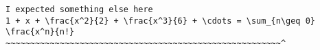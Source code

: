 \begin{verbatim}
I expected something else here
1 + x + \frac{x^2}{2} + \frac{x^3}{6} + \cdots = \sum_{n\geq 0} \frac{x^n}{n!}
~~~~~~~~~~~~~~~~~~~~~~~~~~~~~~~~~~~~~~~~~~~~~~~~~~~~~~~~^
\end{verbatim}
